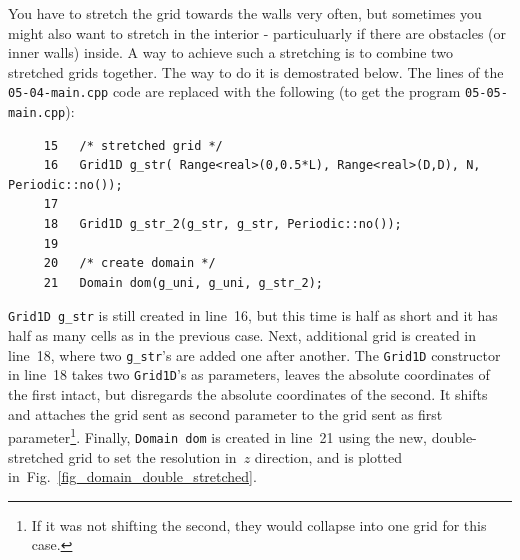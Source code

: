 You have to stretch the grid towards the walls very often, but sometimes
you might also want to stretch in the interior - particuluarly if there
are obstacles (or inner walls) inside. A way to achieve such a stretching
is to combine two stretched grids together. The way to do it is demostrated
below. The lines of the {\tt 05-04-main.cpp} code are replaced with the 
following (to get the program {\tt 05-05-main.cpp}):
%
{\small \begin{verbatim}
     15   /* stretched grid */
     16   Grid1D g_str( Range<real>(0,0.5*L), Range<real>(D,D), N, Periodic::no());
     17
     18   Grid1D g_str_2(g_str, g_str, Periodic::no());
     19
     20   /* create domain */
     21   Domain dom(g_uni, g_uni, g_str_2);
\end{verbatim}}
%
{\tt Grid1D g\_str} is still created in line~16, but this time is half
as short and it has half as many cells as in the previous case. Next,
additional grid is created in line~18, where two {\tt g\_str}'s are
added one after another. The {\tt Grid1D} constructor in line~18 
takes two {\tt Grid1D}'s as parameters, leaves the absolute coordinates
of the first intact, but disregards the absolute coordinates of the second.
It shifts and attaches the grid sent as second parameter to the grid sent
as first parameter\footnote{If it was not shifting the second, they
would collapse into one grid for this case.}. 
Finally, {\tt Domain dom} is created in line~21 using the new,
double-stretched grid to set the resolution in~$z$ direction, and
is plotted in~Fig.~\ref{fig_domain_double_stretched}. 


